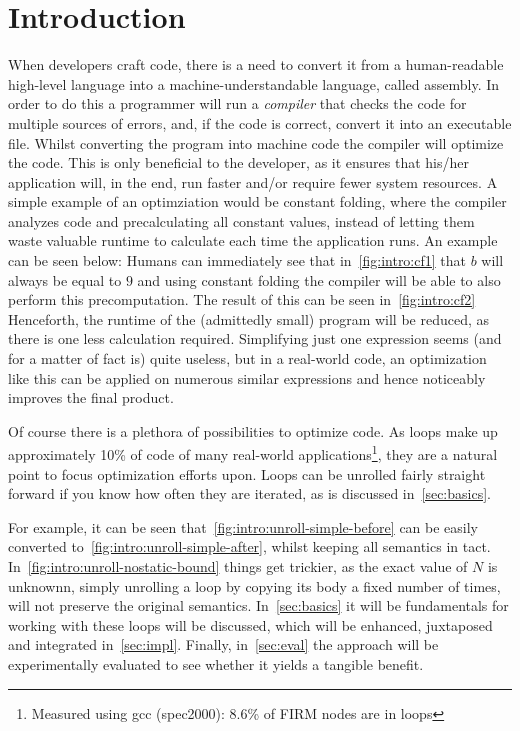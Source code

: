 \chapter{Introduction}\label{sec:intro}



When developers craft code, there is a need to convert it from a human-readable high-level language into a machine-understandable language, called assembly.
In order to do this a programmer will run a \textit{compiler} that checks the code for multiple sources of errors, and, if the code is correct, convert it into an executable file.
Whilst converting the program into machine code the compiler will optimize the code.
This is only beneficial to the developer, as it ensures that his/her application will, in the end, run faster and/or require fewer system resources.
A simple example of an optimziation would be constant folding, where the compiler analyzes code and precalculating all constant values, instead of letting them waste valuable runtime to calculate each time the application runs.
An example can be seen below:
Humans can immediately see that in~\cref{fig:intro:cf1} that $b$ will always be equal to $9$ and using constant folding the compiler will be able to also perform this precomputation.
The result of this can be seen in~\cref{fig:intro:cf2}
Henceforth, the runtime of the (admittedly small) program will be reduced, as there is one less calculation required.
Simplifying just one expression seems (and for a matter of fact is) quite useless, but in a real-world code, an optimization like this can be applied on numerous similar expressions and hence noticeably improves the final product.



Of course there is a plethora of possibilities to optimize code.
As loops make up approximately 10\% of code of many real-world applications\footnote{Measured using gcc (spec2000): 8.6\% of FIRM nodes are in loops}, they are a natural point to focus optimization efforts upon.
Loops can be unrolled fairly straight forward if you know how often they are iterated, as is discussed in~\cref{sec:basics}.

For example, it can be seen that~\cref{fig:intro:unroll-simple-before} can be easily converted to~\cref{fig:intro:unroll-simple-after}, whilst keeping all semantics in tact.
In~\cref{fig:intro:unroll-nostatic-bound} things get trickier, as the exact value of $N$ is unknownn, simply unrolling a loop by copying its body a fixed number of times, will not preserve the original semantics.
In~\cref{sec:basics} it will be fundamentals for working with these loops will be discussed, which will be enhanced, juxtaposed and integrated in~\cref{sec:impl}.
Finally, in~\cref{sec:eval} the approach will be experimentally evaluated to see whether it yields a tangible benefit.





